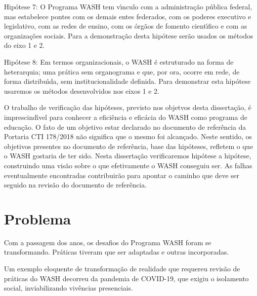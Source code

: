 \documentclass[
12pt,		%
openright,	%
twoside,  %
a4paper,			%
chapter=TITLE,		%
english,			%
french,				%
spanish,			%
brazil				%
]{USPSC-classe/USPSC}
\begin{document}
\begin{alineas}
\item Hip\'otese 7: O Programa WASH tem v\'{\i}nculo com a administra\c{c}\~ao p\'ublica federal, mas estabelece pontes com os demais entes federados, com os poderes executivo e legislativo, com as redes de ensino, com os \'org\~aos de fomento cient\'{\i}fico e com as organiza\c{c}\~oes sociais. Para a demonstra\c{c}\~ao desta hip\'otese ser\~ao usados os m\'etodos do eixo 1 e 2.
\item Hip\'otese 8: Em termos organizacionais, o WASH \'e estruturado na forma de heterarquia; uma pr\'atica sem organograma e que, por ora, ocorre em rede, de forma distribu\'{\i}da, sem institucionalidade definida. Para demonstrar esta hip\'otese usaremos os m\'etodos desenvolvidos nos eixos 1 e 2.
\end{alineas}

O trabalho de verifica\c{c}\~ao das hip\'oteses, previsto nos objetvos desta disserta\c{c}\~ao, \'e imprescind\'{\i}vel para conhecer a efici\^encia e efic\'acia do WASH como programa de educa\c{c}\~ao. O fato de um objetivo estar declarado no documento de refer\^encia da Portaria CTI 178/2018 n\~ao significa que o mesmo foi alcan\c{c}ado. Neste sentido, os objetivos presentes no  documento de refer\^encia, base das hip\'oteses, refletem \textquotedbl o que o WASH gostaria de ter sido\textquotedbl . Nesta disserta\c{c}\~ao verificaremos hip\'otese a hip\'otese, construindo uma vis\~ao sobre \textquotedbl o que efetivamente o WASH conseguiu ser\textquotedbl . As falhas eventualmente encontradas contribuir\~ao para apontar o caminho que deve ser seguido na revis\~ao do documento de refer\^encia.










\section[Problema]{Problema}\label{Problema}
Com a passagem dos anos, os desafios do Programa WASH foram se transformando.  Pr\'aticas tiveram que ser adaptadas e outras incorporadas.










Um exemplo eloquente de transforma\c{c}\~ao de realidade que requereu revis\~ao de pr\'aticas do WASH decorreu da pandemia de COVID-19, que exigiu o isolamento social, inviabilizando viv\^encias presenciais.
\end{document}
